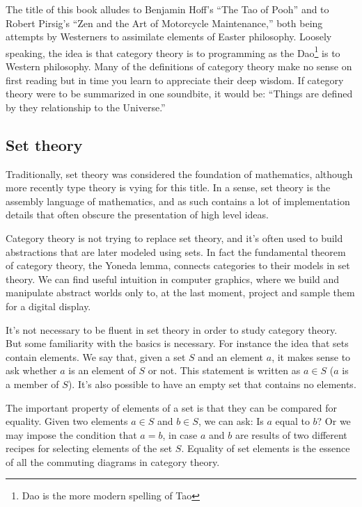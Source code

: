 \documentclass[11pt, book]{memoir}
\begin{document}
The title of this book alludes to Benjamin Hoff's ``The Tao of Pooh'' and to Robert Pirsig's ``Zen and the Art of Motorcycle Maintenance,'' both being attempts by Westerners to assimilate elements of Easter philosophy. Loosely speaking, the idea is that category theory is to programming as the Dao\footnote{Dao is the more modern spelling of Tao} is to Western philosophy. Many of the definitions of category theory make no sense on first reading but in time you learn to appreciate their deep wisdom. If category theory were to be summarized in one soundbite, it would be: ``Things are defined by they relationship to the Universe.'' 

\subsection{Set theory}

Traditionally, set theory was considered the foundation of mathematics, although more recently type theory is vying for this title. In a sense, set theory is the assembly language of mathematics, and as such contains a lot of implementation details that often obscure  the presentation of high level ideas. 

Category theory is not trying to replace set theory, and it's often used to build abstractions that are later modeled using sets. In fact the fundamental theorem of category theory, the Yoneda lemma, connects categories to their models in set theory. We can find useful intuition in computer graphics, where we build and manipulate abstract worlds only to, at the last moment, project and sample them for a digital display.

It's not necessary to be fluent in set theory in order to study category theory. But some familiarity with the basics is necessary. For instance the idea that sets contain elements. We say that, given a set $S$ and an element $a$, it makes sense to ask whether $a$ is an element of $S$ or not. This statement is written as $a \in S$ ($a$ is a member of $S$). It's also possible to have an empty set that contains no elements. 

The important property of elements of a set is that they can be compared for equality. Given two elements $a \in S$ and $b \in S$, we can ask: Is $a$ equal to $b$? Or we may impose the condition that $a = b$, in case $a$ and $b$ are results of two different recipes for selecting elements of the set $S$. Equality of set elements is the essence of all the commuting diagrams in category theory.
\end{document}
